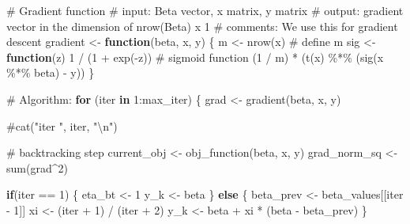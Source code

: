 \documentclass[
  letterpaper,
  DIV=11,
  numbers=noendperiod]{scrartcl}
\newenvironment{Shaded}{\begin{snugshade}}{\end{snugshade}}
\newcommand{\CommentTok}[1]{\textcolor[rgb]{0.37,0.37,0.37}{#1}}
\newcommand{\ControlFlowTok}[1]{\textcolor[rgb]{0.00,0.23,0.31}{\textbf{#1}}}
\newcommand{\DecValTok}[1]{\textcolor[rgb]{0.68,0.00,0.00}{#1}}
\newcommand{\FunctionTok}[1]{\textcolor[rgb]{0.28,0.35,0.67}{#1}}
\newcommand{\NormalTok}[1]{\textcolor[rgb]{0.00,0.23,0.31}{#1}}
\newcommand{\OtherTok}[1]{\textcolor[rgb]{0.00,0.23,0.31}{#1}}
\newcommand{\SpecialCharTok}[1]{\textcolor[rgb]{0.37,0.37,0.37}{#1}}
\begin{document}
\begin{Shaded}
\begin{Highlighting}[]
  \CommentTok{\# Gradient function}
  \CommentTok{\# input: Beta vector, x matrix, y matrix}
  \CommentTok{\# output: gradient vector in the dimension of nrow(Beta) x 1}
  \CommentTok{\# comments: We use this for gradient descent}
\NormalTok{  gradient }\OtherTok{\textless{}{-}} \ControlFlowTok{function}\NormalTok{(beta, x, y) \{}
\NormalTok{    m }\OtherTok{\textless{}{-}} \FunctionTok{nrow}\NormalTok{(x)                       }\CommentTok{\# define m}
\NormalTok{    sig }\OtherTok{\textless{}{-}} \ControlFlowTok{function}\NormalTok{(z) }\DecValTok{1} \SpecialCharTok{/}\NormalTok{ (}\DecValTok{1} \SpecialCharTok{+} \FunctionTok{exp}\NormalTok{(}\SpecialCharTok{{-}}\NormalTok{z))  }\CommentTok{\# sigmoid function}
\NormalTok{    (}\DecValTok{1} \SpecialCharTok{/}\NormalTok{ m) }\SpecialCharTok{*}\NormalTok{ (}\FunctionTok{t}\NormalTok{(x) }\SpecialCharTok{\%*\%}\NormalTok{ (}\FunctionTok{sig}\NormalTok{(x }\SpecialCharTok{\%*\%}\NormalTok{ beta) }\SpecialCharTok{{-}}\NormalTok{ y))}
\NormalTok{  \}}

  \CommentTok{\# Algorithm:}
  \ControlFlowTok{for}\NormalTok{ (iter }\ControlFlowTok{in} \DecValTok{1}\SpecialCharTok{:}\NormalTok{max\_iter) \{}
\NormalTok{    grad }\OtherTok{\textless{}{-}} \FunctionTok{gradient}\NormalTok{(beta, x, y)}
    
    \CommentTok{\#cat("iter ", iter, "\textbackslash{}n")}
    
    \CommentTok{\# backtracking step}
\NormalTok{    current\_obj }\OtherTok{\textless{}{-}} \FunctionTok{obj\_function}\NormalTok{(beta, x, y)}
\NormalTok{    grad\_norm\_sq }\OtherTok{\textless{}{-}} \FunctionTok{sum}\NormalTok{(grad}\SpecialCharTok{\^{}}\DecValTok{2}\NormalTok{)}
    
    \ControlFlowTok{if}\NormalTok{(iter }\SpecialCharTok{==} \DecValTok{1}\NormalTok{) \{}
\NormalTok{      eta\_bt }\OtherTok{\textless{}{-}} \DecValTok{1}
\NormalTok{      y\_k }\OtherTok{\textless{}{-}}\NormalTok{ beta}
\NormalTok{    \} }\ControlFlowTok{else}\NormalTok{ \{}
\NormalTok{      beta\_prev }\OtherTok{\textless{}{-}}\NormalTok{ beta\_values[[iter }\SpecialCharTok{{-}} \DecValTok{1}\NormalTok{]]}
\NormalTok{      xi }\OtherTok{\textless{}{-}}\NormalTok{ (iter }\SpecialCharTok{+} \DecValTok{1}\NormalTok{) }\SpecialCharTok{/}\NormalTok{ (iter }\SpecialCharTok{+} \DecValTok{2}\NormalTok{)}
\NormalTok{      y\_k }\OtherTok{\textless{}{-}}\NormalTok{ beta }\SpecialCharTok{+}\NormalTok{ xi }\SpecialCharTok{*}\NormalTok{ (beta }\SpecialCharTok{{-}}\NormalTok{ beta\_prev)}
\NormalTok{    \}}


\end{Highlighting}
\end{Shaded}
\end{document}
